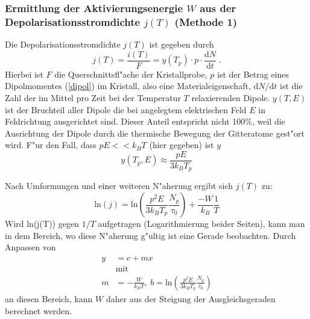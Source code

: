     \subsubsection{Ermittlung der Aktivierungsenergie $W$ aus der Depolarisationsstromdichte $j(T)$ (Methode 1)}
      Die Depolarisationsstromdichte $j(T)$ ist gegeben durch
      \begin{equation}
        j(T) = \frac{i(T)}{F} = y(T_p)\cdot p \cdot\frac{\text{d}N}{\text{d}t} \; .
      \end{equation}
      Hierbei ist $F$ die Querschnittsfl"ache der Kristallprobe, $p$ ist der Betrag eines Dipolmomentes (\ref{dipol}) im Kristall, also eine Materialeigenschaft,
      $\text{d}N/\text{d}t$ ist die Zahl der im Mittel pro Zeit bei der Temperatur $T$ relaxierenden Dipole.
      $y(T,E)$ ist der Bruchteil aller Dipole die bei angelegtem elektrischen Feld $E$ in Feldrichtung ausgerichtet sind. Dieser Anteil entspricht nicht 100\%, weil die Ausrichtung der Dipole durch die thermische Bewegung der Gitteratome gest"ort wird.
      F"ur den Fall, dass $pE<<k_BT$ (hier gegeben) ist $y$
      \begin{equation}
        y(T_p,E) \approx \frac{pE}{3k_BT_p}
      \end{equation}


      Nach Umformungen und einer weiteren N"aherung ergibt sich $j(T)$ zu:
      \begin{equation}
          \text{ln}(j) = \text{ln}\left( \frac{p^2E}{3k_BT_p}\frac{N_p}{\tau_0} \right) + \frac{-W}{k_B}\frac{1}{T}
        \label{depolarisationsstromdichte}
      \end{equation}
      Wird ln(j(T)) gegen $1/T$ aufgetragen (Logarithmierung beider Seiten), kann man in dem Bereich, wo diese N"aherung g"ultig ist eine Gerade beobachten.
      Durch Anpassen von
      \begin{align}
        y &= c + mx\\
        &\text{mit}\\
        m &=-\frac{W}{k_BT}, \: b=\text{ln}\left( \frac{p^2E}{3k_BT_p}\frac{N_p}{\tau_0} \right)
        \label{methode1}
      \end{align}
      an diesen Bereich, kann $W$ daher aus der Steigung der Ausgleichsgeraden berechnet werden.


